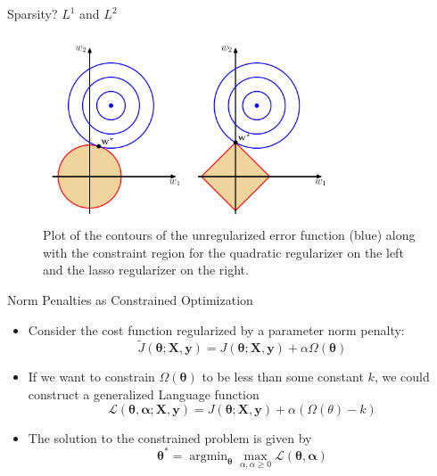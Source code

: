 \documentclass[10pt]{beamer}
\begin{document}
	\begin{frame}{Sparsity? $L^1$ and $L^2$}
		\begin{figure}
			\includegraphics[height=15em]{figures/prml-l1-l2-contours.png}
			\caption{Plot of the contours of the unregularized error function (blue) along with the constraint region for the quadratic regularizer on the left and the lasso regularizer on the right.}
		\end{figure}
	\end{frame}
	
	\begin{frame}{Norm Penalties as Constrained Optimization}
		\begin{itemize}
			\item Consider the cost function regularized by a parameter norm penalty:
			$$\tilde{J}(\bm{\theta};\bm{X},\bm{y})=J(\bm{\theta};\bm{X},\bm{y})+\alpha\Omega(\bm{\theta})$$
			
			\pause
			\item If we want to constrain $\Omega(\bm{\theta})$ to be less than some constant $k$, we could construct a generalized Language function
			$$\mathcal{L}(\bm{\theta,\alpha;\bm{X},\bm{y}})=J(\bm{\theta};\bm{X},\bm{y})+\alpha(\Omega(\theta)-k)$$
			
			\pause
			\item The solution to the constrained problem is given by
			$$\bm{\theta}^*=\mathop{\arg\min}_{\bm{\theta}}\mathop{\max}_{\alpha,\alpha\geq0}\mathcal{L}(\bm{\theta,\alpha}) $$
		\end{itemize}
	\end{frame}
\end{document}
